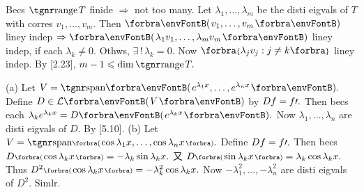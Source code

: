 Becs $\range T$ finide $\Rightarrow$ not too many. Let $\lambda_1,\dots,\lambda_m$ be the disti eigvals of $T$ with corres $v_1,\dots,v_m.$\parSol{}
Then $\Par{v_1,\dots,v_m}$ liney indep $\Rightarrow\Par{\lambda_1 v_1,\dots,\lambda_m v_m}$ liney indep, if each $\lambda_k\neq 0.$ \;Othws,\parSol{}
$\exists\,!\,\lambda_k=0.$ Now $\Bra{\lambda_jv_j:j\neq k}$ liney indep. By [2.23], $m-1\leqslant\dim\range T.$\PfEnd
\SepLine



\pagebreak
{}(a) Let $V=\Span{e^{\lambda_1x},\dots,e^{\lambda_nx}}.$ Define $D\in\Lm{V}$ by $Df=f\prime.$\parSol{\Ha}
Then becs each $\lambda_k e^{\lambda_k x}=D\Par{e^{\lambda_k x}}.$ Now $\lambda_1,\dots,\lambda_n$ are disti eigvals of $D.$ By [5.10].\PfEnd\vspace{2pt}\parSol{}
(b) Let $V=\Span[\BigPar]{\!\cos{\lambda_1 x},\dots,\cos{\lambda_n x}}.$ Define $Df=f\prime.$\parSol{\Hb}
Then becs $D\BigPar{\!\cos{\lambda_k x}}=-\lambda_k\sin{\lambda_k x}.$ 又 $D\BigPar{\!\sin{\lambda_k x}}=\lambda_k\cos{\lambda_k x}.$\parSol{\Hb}
Thus $D^2\BigPar{\!\cos{\lambda_k x}}=-\lambda_k^2\cos{\lambda_k x}.$ Now $-\lambda_1^2,\dots,-\lambda_n^2$ are disti eigvals of $D^2.$ Simlr.\PfEnd
\SepLine

